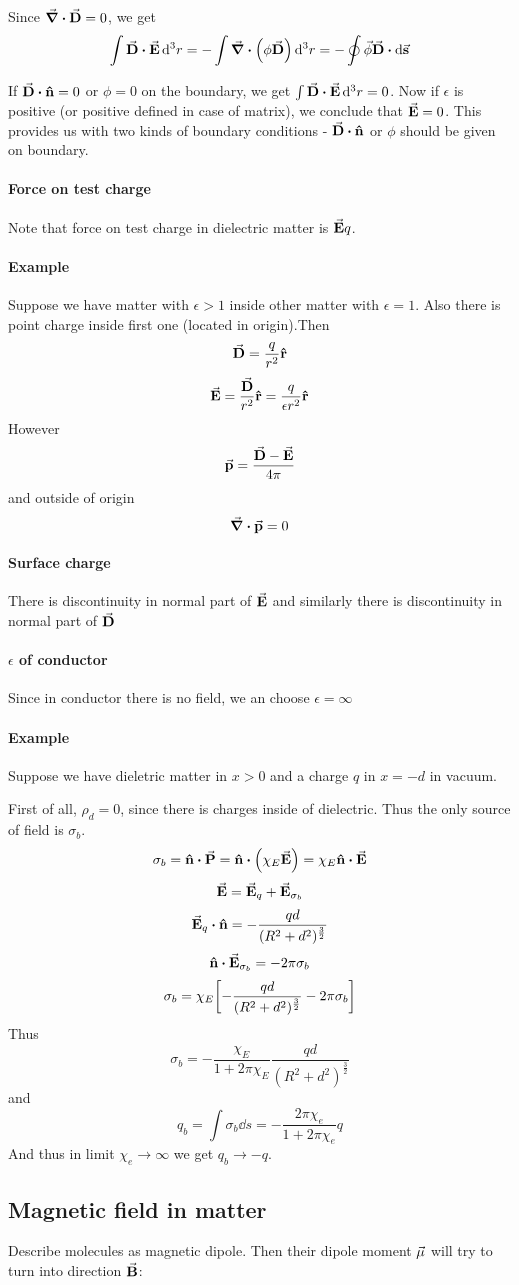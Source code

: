 Since $\div{\va{D}} = 0$, we get
$$\int \va{D}\vdot \va{E} \dd[3]{r} = -\int \div(\phi\va{D}) \dd[3]{r} =-\oint \va{\phi} \va{D} \vdot \dd{\va{s}}$$

If $\va{D} \vdot \vu{n} = 0 $ or $\phi=0$ on the boundary, we get $\int \va{D}\vdot \va{E} \dd[3]{r} = 0$. Now if $\epsilon$ is positive (or positive defined in case of matrix), we conclude that $\va{E}=0$. This provides us with two kinds of boundary conditions - $\va{D} \vdot \vu{n} $ or $\phi$ should be given on boundary.

\paragraph{Force on test charge}
Note that force on test charge in dielectric matter is $\va{E}q$.
\paragraph{Example}
Suppose we have matter with $\epsilon>1$ inside other matter with $\epsilon=1$. Also there is point charge inside first one (located in origin).Then
$$\va{D}= \frac{q}{r^2}\vu{r}$$
$$\va{E} = \frac{\va{D}}{r^2}\vu{r}= \frac{q}{\epsilon r^2}\vu{r}$$
However
$$\va{p} = \frac{\va{D} - \va{E}}{4\pi}$$
and outside of origin
$$\div{\va{p}} = 0$$
\paragraph{Surface charge}
There is discontinuity in normal part of $\va{E}$ and similarly there is discontinuity in normal part of $\va{D}$
\paragraph{$\epsilon$ of conductor}
Since in conductor there is no field, we an choose $\epsilon=\infty$ 
\paragraph{Example}
Suppose we have dieletric matter in $x>0$ and a charge $q$ in $x=-d$ in vacuum.

First of all, $\rho_d = 0$, since there is charges inside of dielectric. Thus the only source of field is $\sigma_b$.
$$\sigma_b = \vu{n} \vdot \va{P} = \vu{n} \vdot \qty(\chi_E \va{E}) = \chi_E \vu{n} \vdot \va{E}$$
$$\va{E} = \va{E}_q + \va{E}_{\sigma_b}$$
$$\va{E}_q \vdot \vu{n}= -\frac{qd}{(R^2+d^2)^{\frac{3}{2}}}$$
$$\vu{n} \vdot \va{E}_{\sigma_b} = -2\pi \sigma_b$$
$$\sigma_b = \chi_E \qty[ -\frac{qd}{(R^2+d^2)^{\frac{3}{2}}} -  2\pi \sigma_b ]$$
Thus
$$\sigma_b = -\frac{\chi_E}{1+2\pi \chi_E} \frac{qd}{(R^2+d^2)^{\frac{3}{2}}} $$
and
$$q_b = \int \sigma_b \dd{s} = -\frac{2\pi \chi_e}{1+2\pi \chi_e} q$$
And thus in limit $\chi_e \to \infty $ we get $q_b \to -q$.

\subsection{Magnetic field in matter}
Describe molecules as magnetic dipole. Then their dipole moment $\va{\mu}$ will try to turn into direction $\va{B}$: